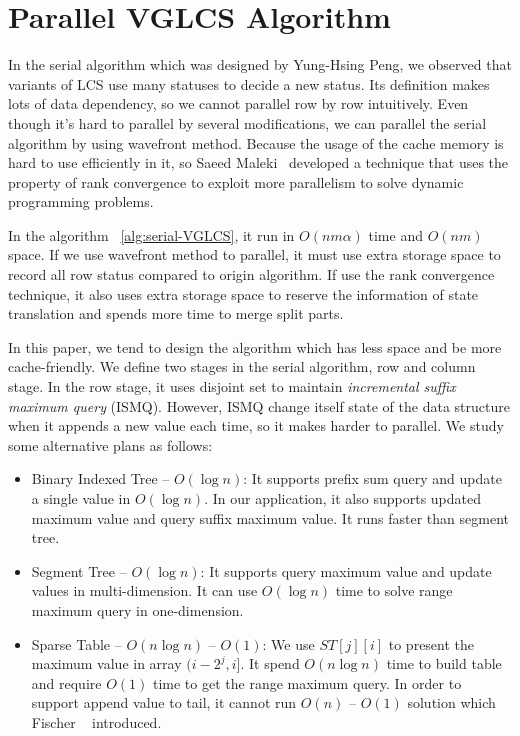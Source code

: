 \section{Parallel VGLCS Algorithm} %
\label{sec:parallelSerial}

In the serial algorithm which was designed by Yung-Hsing Peng, we
observed that variants of LCS use many statuses to decide a new
status. Its definition makes lots of data dependency, so we cannot
parallel row by row intuitively.  Even though it's hard to parallel by
several modifications, we can parallel the serial algorithm by using
wavefront method.  Because the usage of the cache memory is hard to
use efficiently in it, so Saeed Maleki~\cite{saeed} developed a
technique that uses the property of rank convergence to exploit more
parallelism to solve dynamic programming problems.



In the algorithm ~\ref{alg:serial-VGLCS}, it run in $O(nm \alpha)$
time and $O(nm)$ space.  If we use wavefront method to parallel, it
must use extra storage space to record all row status compared to
origin algorithm.  If use the rank convergence technique, it also uses
extra storage space to reserve the information of state translation
and spends more time to merge split parts.

In this paper, we tend to design the algorithm which has less space
and be more cache-friendly.  We define two stages in the serial
algorithm, row and column stage.  In the row stage, it uses disjoint
set to maintain \emph{incremental suffix maximum query} (ISMQ).
However, ISMQ change itself state of the data structure when it
appends a new value each time, so it makes harder to parallel.  We
study some alternative plans as follows:

\begin{itemize}
  \item 

Binary Indexed Tree -- $O(\log n)$: It supports prefix sum query and
update a single value in $O(\log n)$.  In our application, it also
supports updated maximum value and query suffix maximum value.  It runs
faster than segment tree.

  \item 

Segment Tree -- $O(\log n)$: It supports query maximum value and
update values in multi-dimension.  It can use $O(\log n)$ time to
solve range maximum query in one-dimension.

  \item 

Sparse Table -- $O(n \log n)$ -- $O(1)$: We use $ST[j][i]$ to present
the maximum value in array $(i-2^j,i]$.  It spend $O(n \log n)$ time
to build table and require $O(1)$ time to get the range maximum query.
In order to support append value to tail, it cannot run $O(n)$ --
$O(1)$ solution which Fischer ~\cite{fischer} introduced.

\end{itemize}

